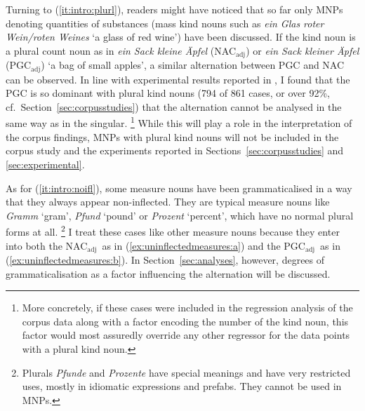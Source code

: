 \documentclass[USenglish]{article}
\newcommand{\Sub}[1]{\ensuremath{\mathrm{_{#1}}}}
\newcommand{\NACa}{NAC\Sub{adj}}
\newcommand{\PGCa}{PGC\Sub{adj}}
\begin{document}
Turning to (\ref{it:intro:plurl}), readers might have noticed that so far only MNPs denoting quantities of substances (mass kind nouns such as \textit{ein Glas roter Wein\slash roten Weines} `a glass of red wine') have been discussed.
If the kind noun is a plural count noun as in \textit{ein Sack kleine Äpfel} (\NACa) or \textit{ein Sack kleiner Äpfel} (\PGCa) `a bag of small apples', a similar alternation between PGC and NAC can be observed.
In line with experimental results reported in \citet[15--16]{Zimmer2015}, I found that the PGC is so dominant with plural kind nouns (794 of 861 cases, or over 92\%, cf.\ Section~\ref{sec:corpusstudies}) that the alternation cannot be analysed in the same way as in the singular.%
\footnote{More concretely, if these cases were included in the regression analysis of the corpus data along with a factor encoding the number of the kind noun, this factor would most assuredly override any other regressor for the data points with a plural kind noun.}
While this will play a role in the interpretation of the corpus findings, MNPs with plural kind nouns will not be included in the corpus study and the experiments reported in Sections~\ref{sec:corpusstudies} and \ref{sec:experimental}.

As for (\ref{it:intro:noifl}), some measure nouns have been grammaticalised in a way that they always appear non-inflected.
They are typical measure nouns like \textit{Gramm} `gram', \textit{Pfund} `pound' or \textit{Prozent} `percent', which have no normal plural forms at all.%
\footnote{Plurals \textit{Pfunde} and \textit{Prozente} have special meanings and have very restricted uses, mostly in idiomatic expressions and prefabs.
They cannot be used in MNPs.}
I treat these cases like other measure nouns because they enter into both the \NACa\ as in (\ref{ex:uninflectedmeasures:a}) and the \PGCa\ as in (\ref{ex:uninflectedmeasures:b}).
In Section~\ref{sec:analyses}, however, degrees of grammaticalisation as a factor influencing the alternation will be discussed.

\begin{exe}
  \ex\label{ex:uninflectedmeasures}
  \begin{xlist}
  \end{xlist}
\end{exe}
\end{document}
